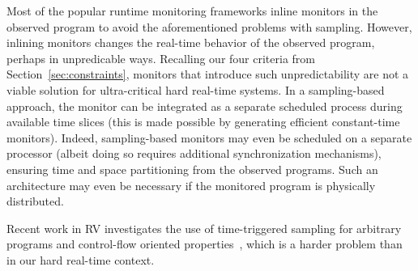 Most of the popular runtime monitoring frameworks inline monitors in
the observed program to avoid the aforementioned problems with
sampling.  However, inlining monitors changes the real-time behavior
of the observed program, perhaps in unpredicable ways. Recalling our
four criteria from Section~\ref{sec:constraints}, monitors that
introduce such unpredictability are not a viable solution for
ultra-critical hard real-time systems.  In a sampling-based approach,
the monitor can be integrated as a separate scheduled process during
available time slices (this is made possible by generating efficient
constant-time monitors).  Indeed, sampling-based monitors may even be
scheduled on a separate processor (albeit doing so requires additional
synchronization mechanisms), ensuring time and space partitioning from
the observed programs.  Such an architecture may even be necessary if
the monitored program is physically distributed. 

Recent work in RV investigates the use of time-triggered sampling for arbitrary
programs and control-flow oriented
properties~\cite{sampling,borzoo,rv11stoller}, which is a harder problem than in
our hard real-time context.

